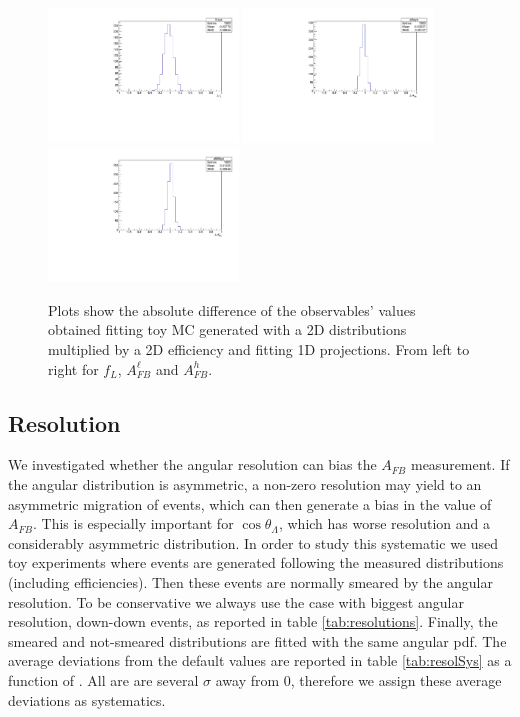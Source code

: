 \begin{figure}
\centering
\includegraphics[width=0.45\textwidth]{Lmumu/figs/fLsys_efficiency.pdf}
\includegraphics[width=0.45\textwidth]{Lmumu/figs/afbsys_efficiency.pdf}
\includegraphics[width=0.45\textwidth]{Lmumu/figs/afbBsys_efficiency.pdf}
\caption{Plots show the absolute difference of the observables' values obtained fitting toy MC generated with a 2D distributions multiplied by a 2D efficiency and fitting 1D projections. From left to right for $f_L$, $A_{FB}^\ell$ and $A_{FB}^h$. }
\label{fig:effBias}
\end{figure}




\subsection{Resolution}

We investigated whether the angular resolution can bias the $A_{FB}$ measurement.
If the angular distribution is asymmetric, a non-zero resolution may yield to an asymmetric migration of events,
which can then generate a bias in the value of $A_{FB}$.
This is especially important for $\cos \theta_\Lambda$, which has worse resolution and a considerably asymmetric distribution.
In order to study this systematic we used toy experiments where events are generated following the measured distributions (including efficiencies).
Then these events are normally smeared by the angular resolution. To be conservative we always use the case with biggest angular resolution,
down-down events, as reported in table \ref{tab:resolutions}.
Finally, the smeared and not-smeared distributions are fitted with the same angular pdf.  
The average deviations from the default values are reported in table \ref{tab:resolSys} as a function of \qsq.
All are are several $\sigma$ away from 0, therefore we assign these average deviations as systematics.


